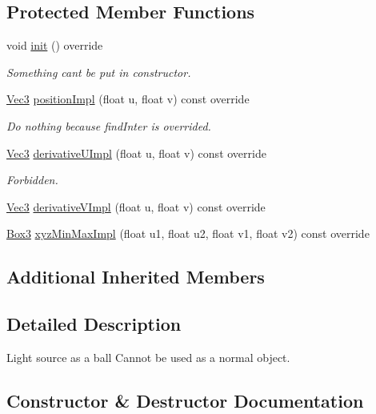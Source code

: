 \subsection*{Protected Member Functions}
\begin{DoxyCompactItemize}
\item 
void \hyperlink{classLightSource_a9001c11824ce30f44bdd9a729cc420a6}{init} () override
\begin{DoxyCompactList}\small\item\em Something can\textquotesingle{}t be put in constructor. \end{DoxyCompactList}\item 
\hyperlink{vec_8h_ae4fcaa7c0a3935930ed1be5f70b90373}{Vec3} \hyperlink{classLightSource_a1ac118f57425ed163c6ab45d6320f401}{position\+Impl} (float u, float v) const override
\begin{DoxyCompactList}\small\item\em Do nothing because find\+Inter is overrided. \end{DoxyCompactList}\item 
\hyperlink{vec_8h_ae4fcaa7c0a3935930ed1be5f70b90373}{Vec3} \hyperlink{classLightSource_ac9506b1c3f773b0de0c30ca78b4a9aa0}{derivative\+U\+Impl} (float u, float v) const override
\begin{DoxyCompactList}\small\item\em Forbidden. \end{DoxyCompactList}\item 
\hyperlink{vec_8h_ae4fcaa7c0a3935930ed1be5f70b90373}{Vec3} \hyperlink{classLightSource_a90b1596aca4c3b818fe73d8ef35065da}{derivative\+V\+Impl} (float u, float v) const override
\item 
\hyperlink{structBox3}{Box3} \hyperlink{classLightSource_a01f7d7c1cca3b8ab7ec688253a46aaec}{xyz\+Min\+Max\+Impl} (float u1, float u2, float v1, float v2) const override
\end{DoxyCompactItemize}
\subsection*{Additional Inherited Members}


\subsection{Detailed Description}
Light source as a ball Cannot be used as a normal object. 

\subsection{Constructor \& Destructor Documentation}
